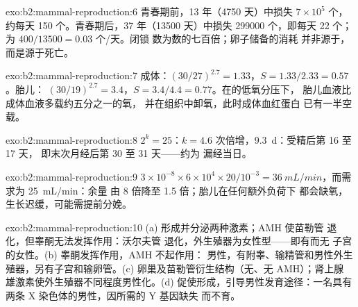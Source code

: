 \begin{solution}{exo:b2:mammal-reproduction:6}
青春期前，13 年（\num{4750} 天）中损失 $7\times 10^{5}$ 个，
约每天 150 个。青春期后，37 年（\num{13500}
天）中损失 \num{299000} 个，即每天 22 个；为 $400/\num{13500} = 0.03$ 个/天。闭锁
数为数的七百倍；卵子储备的消耗
并非源于，而是源于死亡。
\end{solution}

\begin{solution}{exo:b2:mammal-reproduction:7}
成体：$(30/27)^{2.7} = 1.33$，$S = 1.33/2.33 = 0.57$。胎儿：
$(30/19)^{2.7} = 3.4$，$S = 3.4/4.4 = 0.77$。在的低氧分压下，
胎儿血液比成体血液多载约五分之一的氧，
并在组织中卸氧，此时成体血红蛋白
已有一半空载。
\end{solution}

\begin{solution}{exo:b2:mammal-reproduction:8}
$2^{k} = 25$：$k = 4.6$ 次倍增，\qty{9.3}{d}：受精后第 16 至 17 天，
即末次月经后第 30 至 31 天——约为
漏经当日。
\end{solution}

\begin{solution}{exo:b2:mammal-reproduction:9}
$3\times 10^{-8}\times 6\times 10^{4}\times 20/10^{-3} =
\qty{36}{mL/min}$，而需求为 \qty{25}{mL/min}：余量
由 8 倍降至 1.5 倍；胎儿在任何额外负荷下
都会缺氧，生长迟缓，可能需提前分娩。
\end{solution}

\begin{solution}{exo:b2:mammal-reproduction:10}
(a) 形成并分泌两种激素；AMH 使苗勒管
退化，但睾酮无法发挥作用：沃尔夫管
退化，外生殖器为女性型——即有而无
子宫的女性。(b) 睾酮发挥作用，AMH 不起作用：
男性，有附睾、输精管和男性外生殖器，另有子宫和输卵管。(c)
卵巢及苗勒管衍生结构（无、无 AMH）；肾上腺
雄激素使外生殖器不同程度男性化。(d)
\emph{} 促使形成，引导男性发育途径：一名具有两条
X 染色体的男性，因所需的 Y 基因缺失
而不育。
\end{solution}

